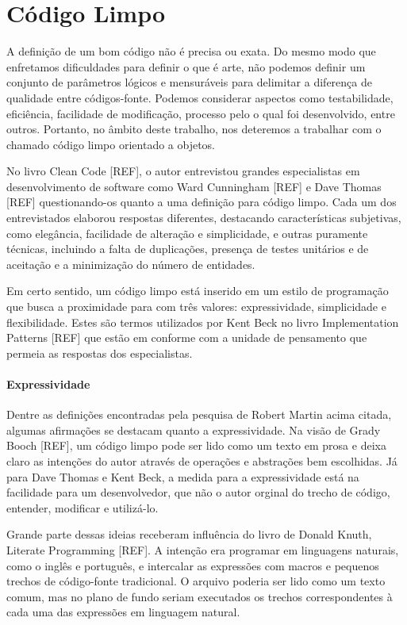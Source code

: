 \chapter{Código Limpo}
\label{chap:codigo_limpo}

A definição de um bom código não é precisa ou exata. Do mesmo modo que enfretamos dificuldades para definir o que é arte, não podemos definir um conjunto de parâmetros lógicos e mensuráveis para delimitar a diferença de qualidade entre códigos-fonte. Podemos considerar aspectos como testabilidade, eficiência, facilidade de modificação, processo pelo o qual foi desenvolvido, entre outros. Portanto, no âmbito deste trabalho, nos deteremos a trabalhar com o chamado código limpo orientado a objetos.

No livro Clean Code [REF], o autor entrevistou grandes especialistas em desenvolvimento de software como Ward Cunningham [REF] e Dave Thomas [REF] questionando-os quanto a uma definição para código limpo. Cada um dos entrevistados elaborou respostas diferentes, destacando características subjetivas, como elegância, facilidade de alteração e simplicidade, e outras puramente técnicas, incluindo a falta de duplicações, presença de testes unitários e de aceitação e a minimização do número de entidades.

Em certo sentido, um código limpo está inserido em um estilo de programação que busca a proximidade para com três valores: expressividade, simplicidade e flexibilidade. Estes são termos utilizados por Kent Beck no livro Implementation Patterns [REF] que estão em conforme com a unidade de pensamento que permeia as respostas dos especialistas.

\subsubsection{Expressividade}
Dentre as definições encontradas pela pesquisa de Robert Martin acima citada, algumas afirmações se destacam quanto a expressividade. Na visão de Grady Booch [REF], um código limpo pode ser lido como um texto em prosa e deixa claro as intenções do autor através de operações e abstrações bem escolhidas. Já para Dave Thomas e Kent Beck, a medida para a expressividade está na facilidade para um desenvolvedor, que não o autor orginal do trecho de código, entender, modificar e utilizá-lo.

Grande parte dessas ideias receberam influência do livro de Donald Knuth, Literate Programming [REF]. A intenção era programar em linguagens naturais, como o inglês e português, e intercalar as expressões com macros e pequenos trechos de código-fonte tradicional. O arquivo poderia ser lido como um texto comum, mas no plano de fundo seriam executados os trechos correspondentes à cada uma das expressões em linguagem natural.

